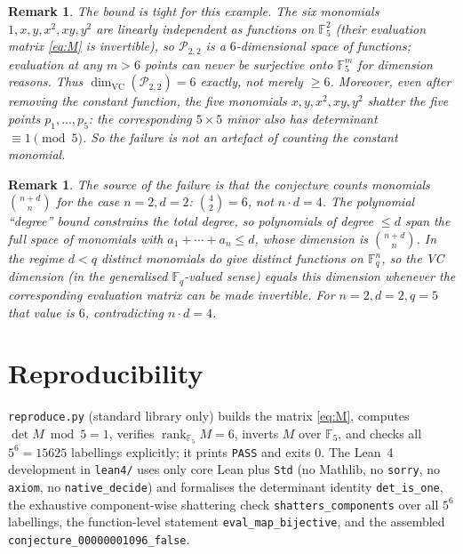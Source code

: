\documentclass[11pt]{article}
\newtheorem{remark}[theorem]{Remark}
\newcommand{\F}{\mathbb{F}}
\DeclareMathOperator{\rank}{rank}
\begin{document}
\begin{remark}
The bound is tight for this example. The six monomials $1,x,y,x^2,xy,y^2$ are
linearly independent as functions on $\F_5^2$ (their evaluation matrix
\eqref{eq:M} is invertible), so $\mathcal{P}_{2,2}$ is a $6$-dimensional space
of functions; evaluation at any $m>6$ points can never be surjective onto
$\F_5^{m}$ for dimension reasons. Thus
$\dim_{\mathrm{VC}}(\mathcal{P}_{2,2})=6$ exactly, not merely $\ge 6$.
Moreover, even after removing the constant function, the five monomials
$x,y,x^2,xy,y^2$ shatter the five points $p_1,\dots,p_5$: the corresponding
$5\times 5$ minor also has determinant $\equiv 1 \pmod 5$. So the failure is not
an artefact of counting the constant monomial.
\end{remark}

\begin{remark}
The source of the failure is that the conjecture counts monomials
$\binom{n+d}{n}$ for the case $n=2,d=2$: $\binom{4}{2}=6$, not $n\cdot d=4$.
The polynomial ``degree'' bound constrains the \emph{total degree}, so
polynomials of degree $\le d$ span the full space of monomials with
$a_1+\cdots+a_n\le d$, whose dimension is $\binom{n+d}{n}$. In the regime
$d<q$ distinct monomials do give distinct functions on $\F_q^n$, so the VC
dimension (in the generalised $\F_q$-valued sense) equals this dimension
whenever the corresponding evaluation matrix can be made invertible. For
$n=2,d=2,q=5$ that value is $6$, contradicting $n\cdot d=4$.
\end{remark}

\section*{Reproducibility}

\texttt{reproduce.py} (standard library only) builds the matrix \eqref{eq:M},
computes $\det M \bmod 5=1$, verifies $\rank_{\F_5}M=6$, inverts $M$ over
$\F_5$, and checks all $5^6=15625$ labellings explicitly; it prints
\texttt{PASS} and exits $0$. The Lean~4 development in \texttt{lean4/} uses
only core Lean plus \texttt{Std} (no Mathlib, no \texttt{sorry}, no
\texttt{axiom}, no \texttt{native\_decide}) and formalises the determinant
identity \texttt{det\_is\_one}, the exhaustive component-wise shattering check
\texttt{shatters\_components} over all $5^6$ labellings, the function-level
statement \texttt{eval\_map\_bijective}, and the assembled
\texttt{conjecture\_00000001096\_false}.
\end{document}
